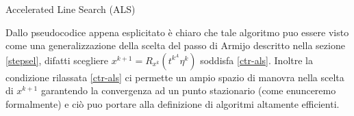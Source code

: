 \documentclass[a4paper, 12pt]{article}
\begin{document}
\begin{center}
\begin{algorithm}[H]
\SetAlgoLined
{}
\caption{Accelerated Line Search (ALS)}
\end{algorithm}
\end{center}
Dallo pseudocodice appena esplicitato è chiaro che tale algoritmo puo essere visto come una generalizzazione della scelta del passo di Armijo descritto nella sezione \ref{stepsel}, difatti scegliere $x^{k+1} = R_{x^k}(t^{k^A}\eta^k)$ soddisfa \eqref{ctr-als}. Inoltre la condizione rilassata \eqref{ctr-als} ci permette un ampio spazio di manovra nella scelta di $x^{k+1}$ garantendo la convergenza ad un punto stazionario (come enunceremo formalmente) e ciò puo portare alla definizione di algoritmi altamente efficienti.
\end{document}
